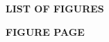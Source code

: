 \newpage
\thispagestyle{empty}

\begin{center}
\fontsize{12}{18}\bfseries\selectfont
LIST OF FIGURES
\end{center}

\vspace{6pt}

\noindent\fontsize{12}{18}\bfseries\selectfont
FIGURE \hfill PAGE

\vspace{6pt}

{\fontsize{12}{18}\selectfont
\makeatletter
{}
\makeatother
}